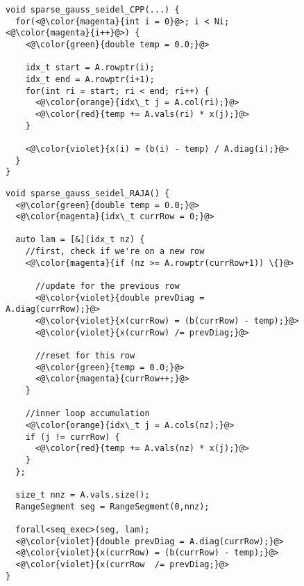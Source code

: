 \begin{figure*}

\begin{subfigure}{0.48\columnwidth}
\begin{lstlisting}[caption={C++ implementation of sparse Gauss-Seidel iterative solve loop nest for CSR data with separately stored diagonal.}]
void sparse_gauss_seidel_CPP(...) {
  for(<@\color{magenta}{int i = 0}@>; i < Ni; <@\color{magenta}{i++}@>) {
    <@\color{green}{double temp = 0.0;}@>

    idx_t start = A.rowptr(i);
    idx_t end = A.rowptr(i+1);
    for(int ri = start; ri < end; ri++) {
      <@\color{orange}{idx\_t j = A.col(ri);}@>
      <@\color{red}{temp += A.vals(ri) * x(j);}@>
    }

    <@\color{violet}{x(i) = (b(i) - temp) / A.diag(i);}@>
  }
}
\end{lstlisting}
\end{subfigure}
\hspace{0.02\columnwidth}
\begin{subfigure}{0.48\columnwidth}
\begin{lstlisting}[caption={Standard RAJA  implementation of sparse Gauss-Seidel iterative solve for CSR data with separately stored diagonal.}]
void sparse_gauss_seidel_RAJA() {
  <@\color{green}{double temp = 0.0;}@>
  <@\color{magenta}{idx\_t currRow = 0;}@>

  auto lam = [&](idx_t nz) {
    //first, check if we're on a new row
    <@\color{magenta}{if (nz >= A.rowptr(currRow+1)) \{}@>

      //update for the previous row
      <@\color{violet}{double prevDiag = A.diag(currRow);}@>
      <@\color{violet}{x(currRow) = (b(currRow) - temp);}@>
      <@\color{violet}{x(currRow) /= prevDiag;}@>

      //reset for this row
      <@\color{green}{temp = 0.0;}@>
      <@\color{magenta}{currRow++;}@>
    }

    //inner loop accumulation
    <@\color{orange}{idx\_t j = A.cols(nz);}@>
    if (j != currRow) {
      <@\color{red}{temp += A.vals(nz) * x(j);}@>
    }
  };

  size_t nnz = A.vals.size();
  RangeSegment seg = RangeSegment(0,nnz);

  forall<seq_exec>(seg, lam);
  <@\color{violet}{double prevDiag = A.diag(currRow);}@>
  <@\color{violet}{x(currRow) = (b(currRow) - temp);}@>
  <@\color{violet}{x(currRow  /= prevDiag;}@>
}
\end{lstlisting}
\end{subfigure}

\caption{Comparison of C++ and RAJA implementations of sparse Gauss-Seidel iterative solve. Text color links parts of each listing with similar function. Unlike the dense variant, the RAJA version must uses completely different logic from the C++ version as RAJA cannot represent multi-dimensional sparse loops.}\label{SparseSparseComparison}
\end{figure*}





